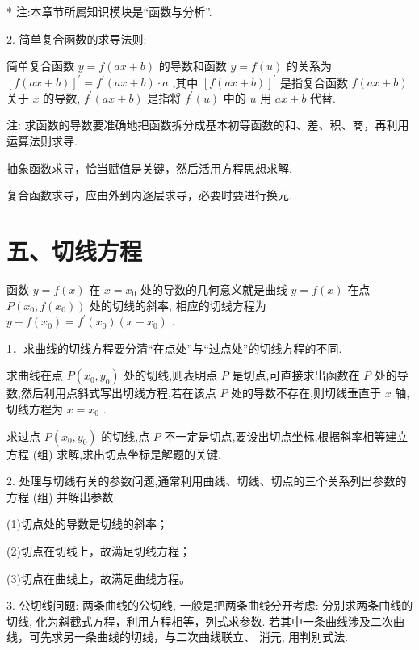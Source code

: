 \HRule

* 注:本章节所属知识模块是“函数与分析”.

\HRule

2. 简单复合函数的求导法则:

简单复合函数 $y = f\left( {{ax} + b}\right)$ 的导数和函数 $y = f\left( u\right)$ 的关系为 ${\left\lbrack  f\left( ax + b\right) \right\rbrack  }^{\prime } = {f}^{\prime }\left( {{ax} + b}\right)  \cdot  a$ ,其中 ${\left\lbrack  f\left( ax + b\right) \right\rbrack  }^{\prime }$ 是指复合函数 $f\left( {{ax} + b}\right)$ 关于 $x$ 的导数, ${f}^{\prime }\left( {{ax} + b}\right)$ 是指将 ${f}^{\prime }\left( u\right)$ 中的 $u$ 用 ${ax} + b$ 代替.

注:   求函数的导数要准确地把函数拆分成基本初等函数的和、差、积、商，再利用运算法则求导.

  抽象函数求导，恰当赋值是关键，然后活用方程思想求解.

  复合函数求导，应由外到内逐层求导，必要时要进行换元.

\section*{五、切线方程}

函数 $y = f\left( x\right)$ 在 $x = {x}_{0}$ 处的导数的几何意义就是曲线 $y = f\left( x\right)$ 在点 $P\left( {{x}_{0},f\left( {x}_{0}\right) }\right)$ 处的切线的斜率, 相应的切线方程为 $y - f\left( {x}_{0}\right)  = {f}^{\prime }\left( {x}_{0}\right) \left( {x - {x}_{0}}\right)$ .

1．求曲线的切线方程要分清“在点处”与“过点处”的切线方程的不同.

求曲线在点 $P\left( {{x}_{0},{y}_{0}}\right)$ 处的切线,则表明点 $P$ 是切点,可直接求出函数在 $P$ 处的导数,然后利用点斜式写出切线方程,若在该点 $P$ 处的导数不存在,则切线垂直于 $x$ 轴,切线方程为 $x = {x}_{0}$ .

求过点 $P\left( {{x}_{0},{y}_{0}}\right)$ 的切线,点 $P$ 不一定是切点,要设出切点坐标,根据斜率相等建立方程 (组) 求解,求出切点坐标是解题的关键.

2. 处理与切线有关的参数问题,通常利用曲线、切线、切点的三个关系列出参数的方程 (组) 并解出参数:

(1)切点处的导数是切线的斜率；

(2)切点在切线上，故满足切线方程；

(3)切点在曲线上，故满足曲线方程。

3. 公切线问题: 两条曲线的公切线, 一般是把两条曲线分开考虑: 分别求两条曲线的切线, 化为斜截式方程，利用方程相等，列式求参数. 若其中一条曲线涉及二次曲线，可先求另一条曲线的切线，与二次曲线联立、 消元, 用判别式法.

